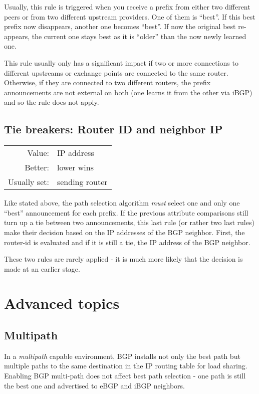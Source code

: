 Usually, this rule is triggered when you receive a prefix from either two different peers or from two different upstream providers. One of them is ``best''. If this best prefix now disappears, another one becomes ``best''. If now the original best re-appears, the current one stays best as it is ``older'' than the now newly learned one.

This rule usually only has a significant impact if two or more connections to different upstreams or exchange points are connected to the same router. Otherwise, if they are connected to two different routers, the prefix announcements are not external on both (one learns it from the other via iBGP) and so the rule does not apply.

\subsection{Tie breakers: Router ID and neighbor IP}
\begin{tabular}{r p{\linewidth}}
Value: & IP address \\
Better: & lower wins \\
Usually set: &  sending router \\
\end{tabular}

Like stated above, the path selection algorithm \emph{must} select one and only one ``best'' announcement for each prefix. If the previous attribute comparisons still turn up a tie between two announcements, this last rule (or rather two last rules) make their decision based on the IP addresses of the BGP neighbor. First, the router-id is evaluated and if it is still a tie, the IP address of the BGP neighbor.

These two rules are rarely applied - it is much more likely that the decision is made at an earlier stage.

\section{Advanced topics}
\subsection{Multipath}
In a \emph{multipath} capable environment, BGP installs not only the best path but multiple paths to the same destination in the IP routing table for load sharing. Enabling BGP multi-path does not affect best path selection - one path is still the best one and advertised to eBGP and iBGP neighbors.

